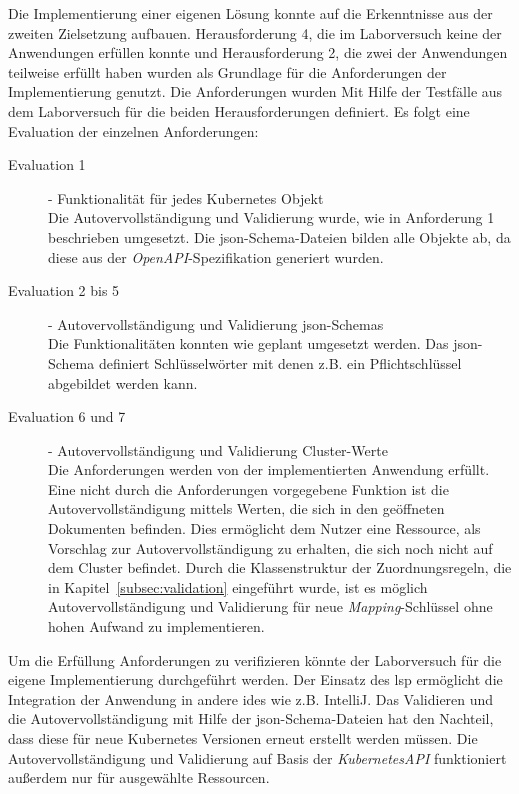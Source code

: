 Die Implementierung einer eigenen Lösung konnte auf die Erkenntnisse aus der zweiten Zielsetzung aufbauen.
Herausforderung 4, die im Laborversuch keine der Anwendungen erfüllen konnte und Herausforderung 2, die zwei der Anwendungen teilweise erfüllt haben
wurden als Grundlage für die Anforderungen der Implementierung genutzt.
Die Anforderungen wurden Mit Hilfe der Testfälle aus dem Laborversuch für die beiden Herausforderungen definiert.
Es folgt eine Evaluation der einzelnen Anforderungen:
\begin{description}
    \item[Evaluation 1]{- Funktionalität für jedes Kubernetes Objekt\\}
          Die Autovervollständigung und Validierung wurde, wie in Anforderung 1 beschrieben umgesetzt.
          Die \ac{json}-Schema-Dateien bilden alle Objekte ab, da diese aus der \textit{OpenAPI}-Spezifikation generiert wurden.
    \item[Evaluation 2 bis 5]{- Autovervollständigung und Validierung \ac{json}-Schemas\\}
          Die Funktionalitäten konnten wie geplant umgesetzt werden. Das \ac{json}-Schema
          definiert Schlüsselwörter mit denen z.B. ein Pflichtschlüssel abgebildet werden kann.
    \item[Evaluation 6 und 7]{- Autovervollständigung und Validierung Cluster-Werte\\}
          Die Anforderungen werden von der implementierten Anwendung erfüllt.
          Eine nicht durch die Anforderungen vorgegebene Funktion ist die Autovervollständigung
          mittels Werten, die sich in den geöffneten Dokumenten befinden. Dies ermöglicht dem Nutzer eine Ressource, als Vorschlag zur Autovervollständigung
          zu erhalten, die sich noch nicht auf dem Cluster befindet.
          Durch die Klassenstruktur der Zuordnungsregeln, die in Kapitel~\ref{subsec:validation} eingeführt wurde, ist
          es möglich Autovervollständigung und Validierung für neue \textit{Mapping}-Schlüssel ohne hohen Aufwand zu implementieren.

\end{description}
Um die Erfüllung Anforderungen zu verifizieren könnte der Laborversuch für die eigene Implementierung durchgeführt werden.
Der Einsatz des \ac{lsp} ermöglicht die Integration der Anwendung in andere \ac{ide}s wie z.B. IntelliJ.
Das Validieren und die Autovervollständigung mit Hilfe der \ac{json}-Schema-Dateien hat den Nachteil, dass diese für neue Kubernetes Versionen
erneut erstellt werden müssen.
Die Autovervollständigung und Validierung auf Basis der \textit{KubernetesAPI} funktioniert außerdem nur für ausgewählte Ressourcen.

